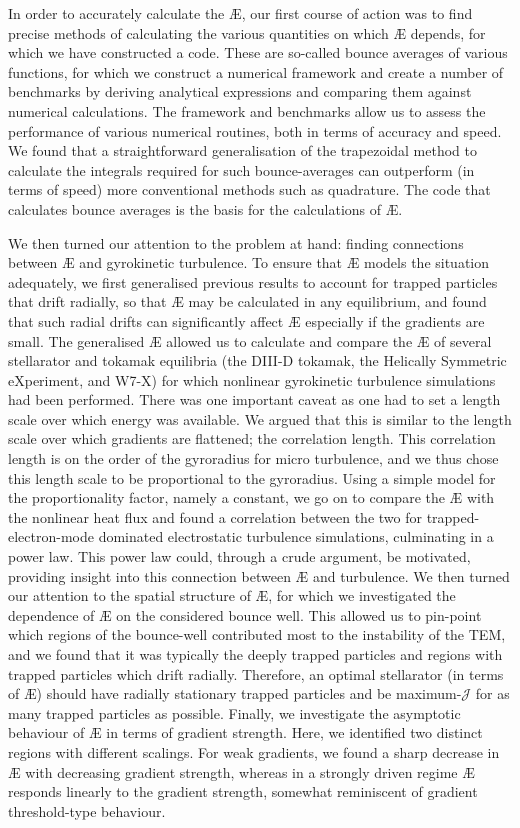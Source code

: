 In order to accurately calculate the \AE{}, our first course of action was to find precise methods of calculating the various quantities on which \AE{} depends, for which we have constructed a code. These are so-called bounce averages of various functions, for which we construct a numerical framework and create a number of benchmarks by deriving analytical expressions and comparing them against numerical calculations. The framework and benchmarks allow us to assess the performance of various numerical routines, both in terms of accuracy and speed. We found that a straightforward generalisation of the trapezoidal method to calculate the integrals required for such bounce-averages can outperform (in terms of speed) more conventional methods such as quadrature. The code that calculates bounce averages is the basis for the calculations of \AE{}. \par 
We then turned our attention to the problem at hand: finding connections between \AE{} and gyrokinetic turbulence. To ensure that \AE{} models the situation adequately, we first generalised previous results to account for trapped particles that drift radially, so that \AE{} may be calculated in any equilibrium, and found that such radial drifts can significantly affect \AE{} especially if the gradients are small. The generalised \AE{} allowed us to calculate and compare the \AE{} of several stellarator and tokamak equilibria (the DIII-D tokamak, the Helically Symmetric eXperiment, and W7-X) for which nonlinear gyrokinetic turbulence simulations had been performed. There was one important caveat as one had to set a length scale over which energy was available. We argued that this is similar to the length scale over which gradients are flattened; the correlation length. This correlation length is on the order of the gyroradius for micro turbulence, and we thus chose this length scale to be proportional to the gyroradius. Using a simple model for the proportionality factor, namely a constant, we go on to compare the \AE{} with the nonlinear heat flux and found a correlation between the two for trapped-electron-mode dominated electrostatic turbulence simulations, culminating in a power law. This power law could, through a crude argument, be motivated, providing insight into this connection between \AE{} and turbulence. We then turned our attention to the spatial structure of \AE{}, for which we investigated the dependence of \AE{} on the considered bounce well. This allowed us to pin-point which regions of the bounce-well contributed most to the instability of the TEM, and we found that it was typically the deeply trapped particles and regions with trapped particles which drift radially. Therefore, an optimal stellarator (in terms of \AE{}) should have radially stationary trapped particles and be maximum-$\mathcal{J}$ for as many trapped particles as possible. Finally, we investigate the asymptotic behaviour of \AE{} in terms of gradient strength. Here, we identified two distinct regions with different scalings. For weak gradients, we found a sharp decrease in \AE{} with decreasing gradient strength, whereas in a strongly driven regime \AE{} responds linearly to the gradient strength, somewhat reminiscent of gradient threshold-type behaviour. \par
